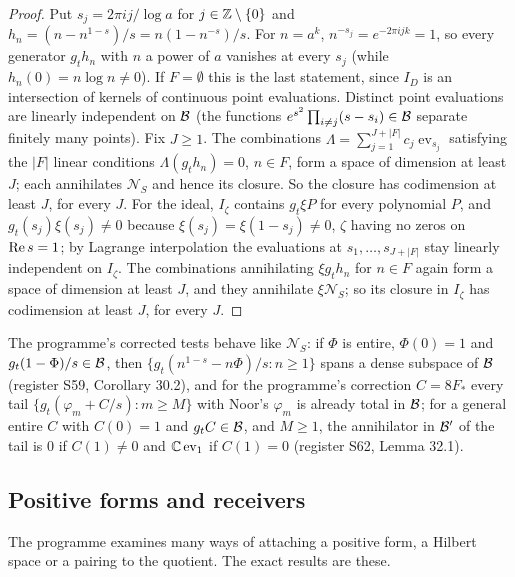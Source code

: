 \begin{proof}
Put $s_j=2\pi ij/\log a$ for $j\in\mathbb{Z}\setminus\{0\}$ and $h_n=(n-n^{1-s})/s=n(1-n^{-s})/s$. For $n=a^k$, $n^{-s_j}=e^{-2\pi ijk}=1$, so every generator $g_th_n$ with $n$ a power of $a$ vanishes at every $s_j$ (while $h_n(0)=n\log n\ne0$). If $F=\emptyset$ this is the last statement, since $I_D$ is an intersection of kernels of continuous point evaluations.
Distinct point evaluations are linearly independent on $\mathcal{B}$ (the functions $e^{s^2}\prod_{i\ne j}(s-s_i)\in\mathcal{B}$ separate finitely many points). Fix $J\ge1$. The combinations $\Lambda=\sum_{j=1}^{J+|F|}c_j\operatorname{ev}_{s_j}$ satisfying the $|F|$ linear conditions $\Lambda(g_th_n)=0$, $n\in F$, form a space of dimension at least $J$; each annihilates $\mathcal{N}_S$ and hence its closure. So the closure has codimension at least $J$, for every $J$.
For the ideal, $I_\zeta$ contains $g_t\xi P$ for every polynomial $P$, and $g_t(s_j)\xi(s_j)\ne0$ because $\xi(s_j)=\xi(1-s_j)\ne0$, $\zeta$ having no zeros on $\operatorname{Re} s=1$; by Lagrange interpolation the evaluations at $s_1,\dots,s_{J+|F|}$ stay linearly independent on $I_\zeta$. The combinations annihilating $\xi g_th_n$ for $n\in F$ again form a space of dimension at least $J$, and they annihilate $\xi\mathcal{N}_S$; so its closure in $I_\zeta$ has codimension at least $J$, for every $J$.
\end{proof}

The programme's corrected tests behave like $\mathcal{N}_S$: if $\Phi$ is entire, $\Phi(0)=1$ and $g_t(1-\Phi)/s\in\mathcal{B}$, then $\{g_t(n^{1-s}-n\Phi)/s:n\ge1\}$ spans a dense subspace of $\mathcal{B}$ (register S59,  Corollary 30.2), and for the programme's correction $C=8F_*$ every tail $\{g_t(\varphi_m+C/s):m\ge M\}$ with Noor's $\varphi_m$ is already total in $\mathcal{B}$; for a general entire $C$ with $C(0)=1$ and $g_tC\in\mathcal{B}$, and $M\ge1$, the annihilator in $\mathcal{B}'$ of the tail is $0$ if $C(1)\ne0$ and $\mathbb{C}\operatorname{ev}_1$ if $C(1)=0$ (register S62,  Lemma 32.1).

\subsection{Positive forms and receivers}\label{ssec:receivers}

The programme examines many ways of attaching a positive form, a Hilbert space or a pairing to the quotient. The exact results are these.

